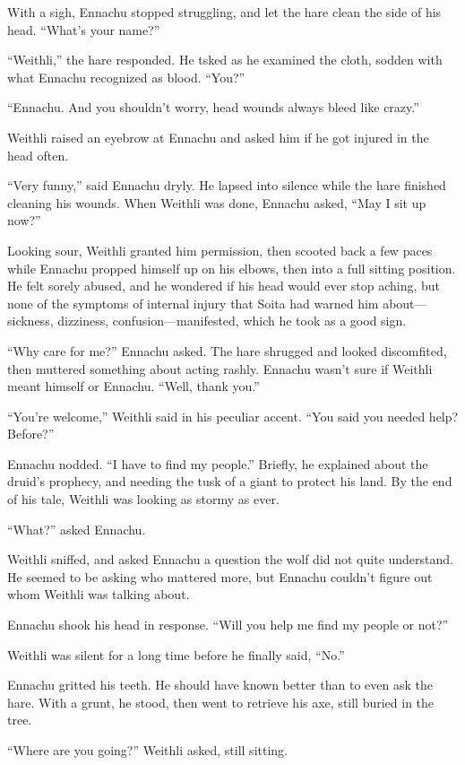With a sigh, Ennachu stopped struggling, and let the hare clean the side of his head. ``What's your name?''

``Weithli,'' the hare responded. He tsked as he examined the cloth, sodden with what Ennachu recognized as blood. ``You?''

``Ennachu. And you shouldn't worry, head wounds always bleed like crazy.''

Weithli raised an eyebrow at Ennachu and asked him if he got injured in the head often.

``Very funny,'' said Ennachu dryly. He lapsed into silence while the hare finished cleaning his wounds. When Weithli was done, Ennachu asked, ``May I sit up now?''

Looking sour, Weithli granted him permission, then scooted back a few paces while Ennachu propped himself up on his elbows, then into a full sitting position. He felt sorely abused, and he wondered if his head would ever stop aching, but none of the symptoms of internal injury that Soita had warned him about---sickness, dizziness, confusion---manifested, which he took as a good sign.

``Why care for me?'' Ennachu asked. The hare shrugged and looked discomfited, then muttered something about acting rashly. Ennachu wasn't sure if Weithli meant himself or Ennachu. ``Well, thank you.''

``You're welcome,'' Weithli said in his peculiar accent. ``You said you needed help? Before?''

Ennachu nodded. ``I have to find my people.'' Briefly, he explained about the druid's prophecy, and needing the tusk of a giant to protect his land. By the end of his tale, Weithli was looking as stormy as ever.

``What?'' asked Ennachu.

Weithli sniffed, and asked Ennachu a question the wolf did not quite understand. He seemed to be asking who mattered more, but Ennachu couldn't figure out whom Weithli was talking about.

Ennachu shook his head in response. ``Will you help me find my people or not?''

Weithli was silent for a long time before he finally said, ``No.''

Ennachu gritted his teeth. He should have known better than to even ask the hare. With a grunt, he stood, then went to retrieve his axe, still buried in the tree.

``Where are you going?'' Weithli asked, still sitting.

